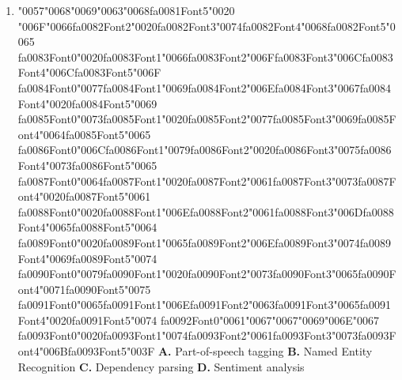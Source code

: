 \documentclass[11pt]{article}
\begin{document}
\begin{enumerate}[leftmargin=*]
  \item {\char"0057}{\char"0068}{\char"0069}{\char"0063}{\char"0068}{\csname fa0081Font5\endcsname\char"0020} {\char"006F}{\char"0066}{\csname fa0082Font2\endcsname\char"0020}{\csname fa0082Font3\endcsname\char"0074}{\csname fa0082Font4\endcsname\char"0068}{\csname fa0082Font5\endcsname\char"0065} {\csname fa0083Font0\endcsname\char"0020}{\csname fa0083Font1\endcsname\char"0066}{\csname fa0083Font2\endcsname\char"006F}{\csname fa0083Font3\endcsname\char"006C}{\csname fa0083Font4\endcsname\char"006C}{\csname fa0083Font5\endcsname\char"006F} {\csname fa0084Font0\endcsname\char"0077}{\csname fa0084Font1\endcsname\char"0069}{\csname fa0084Font2\endcsname\char"006E}{\csname fa0084Font3\endcsname\char"0067}{\csname fa0084Font4\endcsname\char"0020}{\csname fa0084Font5\endcsname\char"0069} {\csname fa0085Font0\endcsname\char"0073}{\csname fa0085Font1\endcsname\char"0020}{\csname fa0085Font2\endcsname\char"0077}{\csname fa0085Font3\endcsname\char"0069}{\csname fa0085Font4\endcsname\char"0064}{\csname fa0085Font5\endcsname\char"0065} {\csname fa0086Font0\endcsname\char"006C}{\csname fa0086Font1\endcsname\char"0079}{\csname fa0086Font2\endcsname\char"0020}{\csname fa0086Font3\endcsname\char"0075}{\csname fa0086Font4\endcsname\char"0073}{\csname fa0086Font5\endcsname\char"0065} {\csname fa0087Font0\endcsname\char"0064}{\csname fa0087Font1\endcsname\char"0020}{\csname fa0087Font2\endcsname\char"0061}{\csname fa0087Font3\endcsname\char"0073}{\csname fa0087Font4\endcsname\char"0020}{\csname fa0087Font5\endcsname\char"0061} {\csname fa0088Font0\endcsname\char"0020}{\csname fa0088Font1\endcsname\char"006E}{\csname fa0088Font2\endcsname\char"0061}{\csname fa0088Font3\endcsname\char"006D}{\csname fa0088Font4\endcsname\char"0065}{\csname fa0088Font5\endcsname\char"0064} {\csname fa0089Font0\endcsname\char"0020}{\csname fa0089Font1\endcsname\char"0065}{\csname fa0089Font2\endcsname\char"006E}{\csname fa0089Font3\endcsname\char"0074}{\csname fa0089Font4\endcsname\char"0069}{\csname fa0089Font5\endcsname\char"0074} {\csname fa0090Font0\endcsname\char"0079}{\csname fa0090Font1\endcsname\char"0020}{\csname fa0090Font2\endcsname\char"0073}{\csname fa0090Font3\endcsname\char"0065}{\csname fa0090Font4\endcsname\char"0071}{\csname fa0090Font5\endcsname\char"0075} {\csname fa0091Font0\endcsname\char"0065}{\csname fa0091Font1\endcsname\char"006E}{\csname fa0091Font2\endcsname\char"0063}{\csname fa0091Font3\endcsname\char"0065}{\csname fa0091Font4\endcsname\char"0020}{\csname fa0091Font5\endcsname\char"0074} {\csname fa0092Font0\endcsname\char"0061}{\char"0067}{\char"0067}{\char"0069}{\char"006E}{\char"0067} {\csname fa0093Font0\endcsname\char"0020}{\csname fa0093Font1\endcsname\char"0074}{\csname fa0093Font2\endcsname\char"0061}{\csname fa0093Font3\endcsname\char"0073}{\csname fa0093Font4\endcsname\char"006B}{\csname fa0093Font5\endcsname\char"003F}
    \textbf{A.} Part-of-speech tagging
    \textbf{B.} Named Entity Recognition
    \textbf{C.} Dependency parsing
    \textbf{D.} Sentiment analysis


\end{enumerate}
\end{document}
